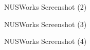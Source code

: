 \documentclass[fyp]{socreport}
\begin{document}
\begin{figure}
\caption{NUSWorks Screenshot (2)}
\label{screen-2}
\end{figure}

\begin{figure}
\caption{NUSWorks Screenshot (3)}
\label{screen-3}
\end{figure}

\begin{figure}
\caption{NUSWorks Screenshot (4)}
\label{screen-4}
\end{figure}
\end{document}
